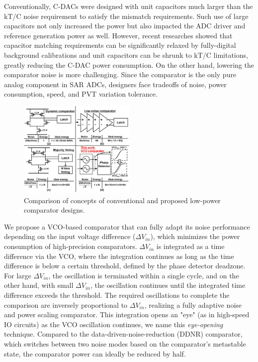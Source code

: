 \documentclass[journal]{IEEEtran}
\begin{document}
Conventionally, C-DACs were designed with unit capacitors much larger than the kT/C noise requirement to satisfy the mismatch requirements. Such use of large capacitors not only increased the power but also impacted the ADC driver and reference generation power as well. However, recent researches showed that capacitor matching requirements can be significantly relaxed by fully-digital background calibrations \cite{liu201012b,liu201112,mcneill2011all,mcneill2005split} and unit capacitors can be shrunk to kT/C limitations, greatly reducing the C-DAC power consumption. 
On the other hand, lowering the comparator noise is more challenging. Since the comparator is the only pure analog component in SAR ADCs, designers face tradeoffs of noise, power consumption, speed, and PVT variation tolerance.

\begin{figure}[!]
\centering
 \includegraphics[width=0.5\textwidth]{figs/fig1.png}
  \caption{Comparison of concepts of conventional and proposed low-power comparator designs.}
  \label{fig1}
\end{figure}

We propose a VCO-based comparator that can fully adapt its noise performance depending on the input voltage difference ($\Delta V_{in}$), which minimizes the power consumption of high-precision comparators\cite{yoshioka201413b}. $\Delta V_{in}$ is integrated as a time difference via the VCO, where the integration continues as long as the time difference is below a certain threshold, defined by the phase detector deadzone. For large $\Delta V_{in}$, the oscillation is terminated within a single cycle, and on the other hand, with small $\Delta V_{in}$, the oscillation continues until the integrated time difference exceeds the threshold. The required oscillations to complete the comparison are inversely proportional to $\Delta V_{in}$, realizing a fully adaptive noise and power scaling comparator. This integration opens an "eye" (as in high-speed IO circuits) as the VCO oscillation continues, we name this \textit{eye-opening} technique. 
Compared to the data-driven-noise-reduction (DDNR) comparator\cite{harpe201310b}, which switches between two noise modes based on the comparator's metastable state, the comparator power can ideally be reduced by half.
\end{document}
